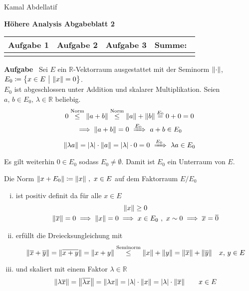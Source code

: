 \documentclass[a4paper, 12pt]{scrartcl}
\let\bar\overline
\newcounter{taski}
\newcommand{\task}{\stepcounter{taski}\textbf{Aufgabe \arabic{taski}}~}
\begin{document}
\begin{flushright}
    Kamal Abdellatif
\end{flushright}
\begin{center}
    \textbf{Höhere Analysis Abgabeblatt 2}\\[2em]
	\def\arraystretch{2}
    \begin{tabular}{|l|l|l||p{18mm}|}
        \hline
         Aufgabe 1 & Aufgabe 2 & Aufgabe 3 & Summe:~ \\
         \hline &&&\\
         \hline  
    \end{tabular}
\end{center}

\task Sei $E$ ein $\mathbb{R}$-Vektorraum ausgestattet mit der Seminorm $\norm{\cdot}$, $E_0 \coloneqq \qty{x \in E ~\big\vert~ \norm{x} = 0}$. \\

$E_0$ ist abgeschlossen unter Addition und skalarer Multiplikation. Seien $a,\, b \in E_0,\, \lambda \in \mathbb{R}$ beliebig.
\begin{gather*}
    0 \stackrel{\text{Norm}}\leq \norm{a+b} \stackrel{\text{Norm}}\leq \norm{a} + \norm{b} \stackrel{E_0}= 0 + 0 = 0 \\
    \implies \norm{a+b} = 0 ~\xRightarrow{E_0}~ a + b \in E_0 \\
    \norm{\lambda a} = |\lambda| \cdot \norm{a} = |\lambda| \cdot 0 = 0 ~\xRightarrow{E_0}~ \lambda a \in E_0
\end{gather*}
Es gilt weiterhin $0 \in E_0$ sodass $E_0 \neq \emptyset$. Damit ist $E_0$ ein Unterraum von $E$.

Die Norm $\norm{x + E_0} \coloneqq \norm{x} ~,~ x \in E$ auf dem Faktorraum $E/E_0$
\begin{enumerate}[(i)]
\item ist positiv definit da für alle $x \in E$
\begin{gather*}
    \norm{x} \geq 0 \\
    \norm{\bar x} = 0 \implies \norm{x} = 0 \implies x \in E_0 ~,~ x \sim 0 \implies \bar x = \bar 0
\end{gather*}
\item erfüllt die Dreiecksungleichung mit
    \[ \norm{\bar x + \bar y} = \norm{\bar{x+y}} = \norm{x + y} \stackrel{\text{Seminorm}}\leq \norm{x} + \norm{y} = \norm{\bar x} + \norm{\bar y} \quad x,\, y \in E\]
\item und skaliert mit einem Faktor $\lambda \in \mathbb{R}$
    \[ \norm{\lambda \bar x} = \norm{\bar{\lambda x}} = \norm{\lambda x} = |\lambda|\cdot\norm{x} = |\lambda|\cdot\norm{\bar x} \qquad x \in E \]
\end{enumerate}
\end{document}
